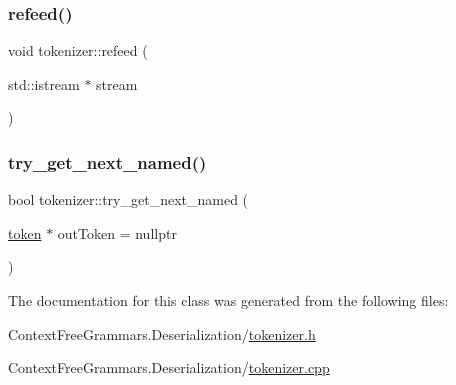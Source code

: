 \subsubsection{\texorpdfstring{refeed()}{refeed()}}
{\footnotesize\ttfamily void tokenizer\+::refeed (\begin{DoxyParamCaption}\item[{std\+::istream $\ast$}]{stream }\end{DoxyParamCaption})}

\mbox{\label{classtokenizer_add70a1d3faf4a0ea659a6bbee8fa1a3f}} 
\subsubsection{\texorpdfstring{try\_get\_next\_named()}{try\_get\_next\_named()}}
{\footnotesize\ttfamily bool tokenizer\+::try\+\_\+get\+\_\+next\+\_\+named (\begin{DoxyParamCaption}\item[{\mbox{\hyperlink{classtoken}{token}} $\ast$}]{out\+Token = {\ttfamily nullptr} }\end{DoxyParamCaption})}



The documentation for this class was generated from the following files\+:\begin{DoxyCompactItemize}
\item 
Context\+Free\+Grammars.\+Deserialization/\mbox{\hyperlink{tokenizer_8h}{tokenizer.\+h}}\item 
Context\+Free\+Grammars.\+Deserialization/\mbox{\hyperlink{tokenizer_8cpp}{tokenizer.\+cpp}}\end{DoxyCompactItemize}
